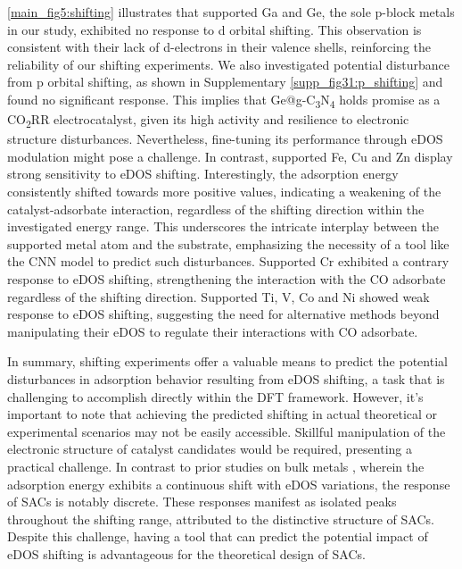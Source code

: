 \cref{main_fig5:shifting} illustrates that supported Ga and Ge, the sole p-block metals in our study,
exhibited no response to d orbital shifting.
This observation is consistent with their lack of d-electrons in their valence shells,
reinforcing the reliability of our shifting experiments.
We also investigated potential disturbance from p orbital shifting,
as shown in Supplementary \cref{supp_fig31:p_shifting} and found no significant response.
This implies that Ge@g-C\textsubscript{3}N\textsubscript{4} holds promise as a CO\textsubscript{2}RR electrocatalyst,
given its high activity and resilience to electronic structure disturbances.
Nevertheless, fine-tuning its performance through eDOS modulation might pose a challenge.
In contrast, supported Fe, Cu and Zn display strong sensitivity to eDOS shifting.
Interestingly, the adsorption energy consistently shifted towards more positive values, indicating a weakening of the catalyst-adsorbate interaction, regardless of the shifting direction within the investigated energy range.
This underscores the intricate interplay between the supported metal atom and the substrate,
emphasizing the necessity of a tool like the CNN model to predict such disturbances.
Supported Cr exhibited a contrary response to eDOS shifting, strengthening the
interaction with the CO adsorbate regardless of the shifting direction.
Supported Ti, V, Co and Ni showed weak response to eDOS shifting,
suggesting the need for alternative methods beyond manipulating their eDOS
to regulate their interactions with CO adsorbate.

In summary, shifting experiments offer a valuable means to predict the potential
disturbances in adsorption behavior resulting from eDOS shifting,
a task that is challenging to accomplish directly within the DFT framework.
However, it's important to note that achieving the predicted shifting
in actual theoretical or experimental scenarios may not be easily accessible.
Skillful manipulation of the electronic structure of catalyst candidates would be required,
presenting a practical challenge.
In contrast to prior studies on bulk metals \cite{fung2021machine},
wherein the adsorption energy exhibits a continuous shift with eDOS variations,
the response of SACs is notably discrete.
These responses manifest as isolated peaks throughout the shifting range,
attributed to the distinctive structure of SACs.
Despite this challenge, having a tool that can predict the potential impact of
eDOS shifting is advantageous for the theoretical design of SACs.
